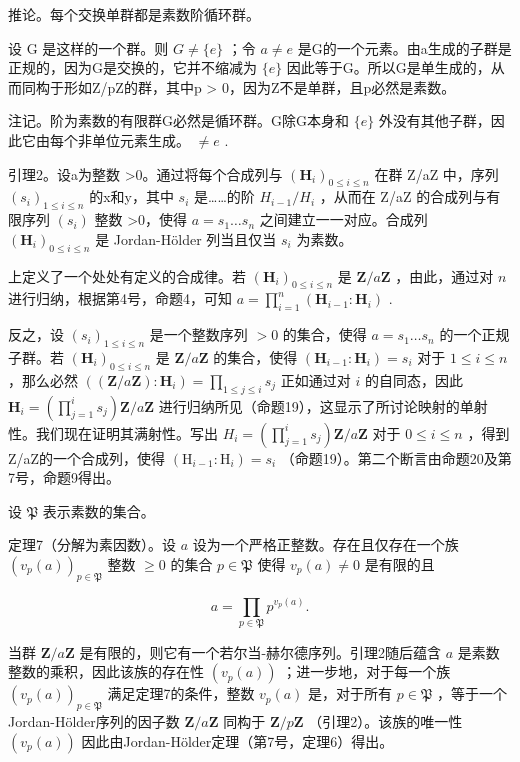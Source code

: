 推论。每个交换单群都是素数阶循环群。

设 G 是这样的一个群。则 \(G \neq \{e\}\) ；令 \(a \neq e\) 是G的一个元素。由a生成的子群是正规的，因为G是交换的，它并不缩减为 \(\{e\}\) 因此等于G。所以G是单生成的，从而同构于形如Z/pZ的群，其中p \textgreater{} 0，因为Z不是单群，且p必然是素数。

注记。阶为素数的有限群G必然是循环群。G除G本身和 \(\{e\}\) 外没有其他子群，因此它由每个非单位元素生成。 \(\neq e\) .

引理2。设a为整数 \textgreater0。通过将每个合成列与 \((\mathbf{H}_{i})_{0\leqslant i\leqslant n}\) 在群 Z/aZ 中，序列 \((s_{i})_{1\leqslant i\leqslant n}\) 的x和y，其中 \(s_{i}\) 是……的阶 \(H_{i-1}/H_{i}\) ，从而在 Z/aZ 的合成列与有限序列 \((s_{i})\) 整数 \textgreater0，使得 \(a=s_{1}\ldots s_{n}\) 之间建立一一对应。合成列 \((\mathbf{H}_{i})_{0\leqslant i\leqslant n}\) 是 Jordan-Hölder 列当且仅当 \(s_{i}\) 为素数。

上定义了一个处处有定义的合成律。若 \((\mathbf{H}_i)_{0\leqslant i\leqslant n}\) 是 \(\mathbf{Z} / a\mathbf{Z}\) ，由此，通过对 \(n\) 进行归纳，根据第4号，命题4，可知 \(a = \prod_{i=1}^{n} (\mathbf{H}_{i-1}:\mathbf{H}_i)\) .

反之，设 \((s_i)_{1 \leqslant i \leqslant n}\) 是一个整数序列 \(>0\) 的集合，使得 \(a = s_1 \ldots s_n\) 的一个正规子群。若 \((\mathbf{H}_i)_{0 \leqslant i \leqslant n}\) 是 \(\mathbf{Z} / a\mathbf{Z}\) 的集合，使得 \((\mathbf{H}_{i-1} : \mathbf{H}_i) = s_i\) 对于 \(1 \leqslant i \leqslant n\) ，那么必然 \(((\mathbf{Z} / a\mathbf{Z}) : \mathbf{H}_i) = \prod_{1 \leqslant j \leqslant i} s_j\) 正如通过对 \(i\) 的自同态，因此 \(\mathbf{H}_i = \left( \prod_{j=1}^{i} s_j \right) \mathbf{Z} / a\mathbf{Z}\) 进行归纳所见（命题19），这显示了所讨论映射的单射性。我们现在证明其满射性。写出 \(H_{i}=\left(\prod_{j=1}^{i}s_{j}\right)\mathbf{Z}/a\mathbf{Z}\) 对于 \(0\leqslant i\leqslant n\) ，得到Z/aZ的一个合成列，使得 \((\mathrm{H}_{i-1}:\mathrm{H}_{i})=s_{i}\) （命题19）。第二个断言由命题20及第7号，命题9得出。

设 \(\mathfrak{P}\) 表示素数的集合。

定理7（分解为素因数）。设 \(a\) 设为一个严格正整数。存在且仅存在一个族 \((v_{p}(a))_{p \in \mathfrak{P}}\) 整数 \(\geqslant 0\) 的集合 \(p \in \mathfrak{P}\) 使得 \(v_{p}(a) \neq 0\) 是有限的且

\[
a = \prod_ {p \in \mathfrak {P}} p ^ {v _ {p} (a)}.\tag{5}
\]

当群 \(\mathbf{Z}/a\mathbf{Z}\) 是有限的，则它有一个若尔当-赫尔德序列。引理2随后蕴含 \(a\) 是素数整数的乘积，因此该族的存在性 \((v_{p}(a))\) ；进一步地，对于每一个族 \((v_{p}(a))_{p\in\mathfrak{P}}\) 满足定理7的条件，整数 \(v_{p}(a)\) 是，对于所有 \(p\in\mathfrak{P}\) ，等于一个Jordan-Hölder序列的因子数 \(\mathbf{Z}/a\mathbf{Z}\) 同构于 \(\mathbf{Z}/p\mathbf{Z}\) （引理2）。该族的唯一性 \((v_{p}(a))\) 因此由Jordan-Hölder定理（第7号，定理6）得出。

